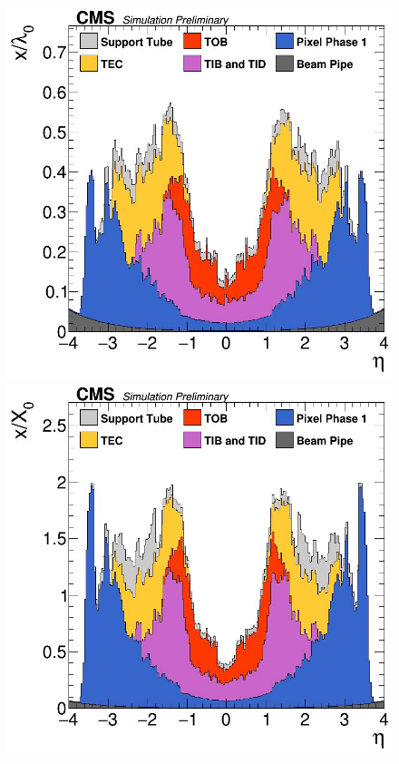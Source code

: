 \begin{figure}[h!]
\centering
\begin{minipage}{\linewidth}
    \centering
\begin{minipage}{0.43\linewidth}
        \centering
        \includegraphics[width=\linewidth]{fig/chap03-cms/material_budget_lambda.png}
\end{minipage}
\hfill
\begin{minipage}{0.43\linewidth}
        \centering
        \includegraphics[width=\linewidth]{fig/chap03-cms/material_budget_X.png}

\end{minipage}
\end{minipage}
\end{figure}
